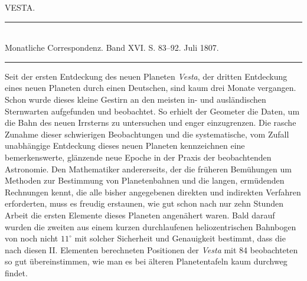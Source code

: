 \clearpage
{}
\hypertarget{native-293-lower}{}
\begin{center}
VESTA.
\end{center}

\begin{center}
\rule{0.6\linewidth}{0.4pt}\\
Monatliche Correspondenz. Band XVI. S. 83–92. Juli 1807.\\
\rule{0.6\linewidth}{0.4pt}
\end{center}

\par\indent Seit der ersten Entdeckung des neuen Planeten \emph{Vesta}, der dritten Entdeckung eines neuen Planeten durch einen Deutschen, sind kaum drei Monate vergangen. Schon wurde dieses kleine Gestirn an den meisten in- und ausländischen Sternwarten aufgefunden und beobachtet. So erhielt der Geometer die Daten, um die Bahn des neuen Irrsterns zu untersuchen und enger einzugrenzen. Die rasche Zunahme dieser schwierigen Beobachtungen und die systematische, vom Zufall unabhängige Entdeckung dieses neuen Planeten kennzeichnen eine bemerkenswerte, glänzende neue Epoche in der Praxis der beobachtenden Astronomie. Den Mathematiker andererseits, der die früheren Bemühungen um Methoden zur Bestimmung von Planetenbahnen und die langen, ermüdenden Rechnungen kennt, die alle bisher angegebenen direkten und indirekten Verfahren erforderten, muss es freudig erstaunen, wie gut schon nach nur zehn Stunden Arbeit die ersten Elemente dieses Planeten angenähert waren. Bald darauf wurden die zweiten aus einem kurzen durchlaufenen heliozentrischen Bahnbogen von noch nicht $11^\circ$ mit solcher Sicherheit und Genauigkeit bestimmt, dass die nach diesen II. Elementen berechneten Positionen der \emph{Vesta} mit 84 beobachteten so gut übereinstimmen, wie man es bei älteren Planetentafeln kaum durchweg findet.

